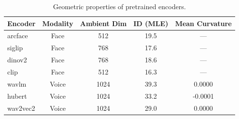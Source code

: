\begin{table}[t]
\centering
\caption{Geometric properties of pretrained encoders.}
\label{tab:encoder_geometry}
\begin{tabular}{lcccc}
\toprule
Encoder & Modality & Ambient Dim & ID (MLE) & Mean Curvature \\
\midrule
  arcface & Face & 512 & 19.5 & — \\
  siglip & Face & 768 & 17.6 & — \\
  dinov2 & Face & 768 & 18.6 & — \\
  clip & Face & 512 & 16.3 & — \\
  wavlm & Voice & 1024 & 39.3 & 0.0000 \\
  hubert & Voice & 1024 & 33.2 & -0.0001 \\
  wav2vec2 & Voice & 1024 & 29.0 & 0.0000 \\
\bottomrule
\end{tabular}
\end{table}